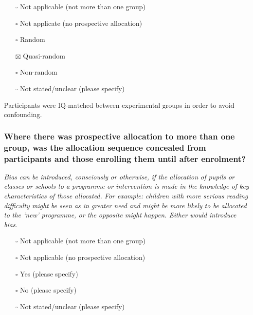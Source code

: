 \documentclass[
  doc, a4paper]{apa7}
\providecommand{\tightlist}{%
  \setlength{\itemsep}{0pt}\setlength{\parskip}{0pt}}
\begin{document}
\begin{itemize}
\tightlist
\item[$\square$]
  Not applicable (not more than one group)\\
\item[$\square$]
  Not applicate (no prospective allocation)\\
\item[$\square$]
  Random\\
\item[$\boxtimes$]
  Quasi-random\\
\item[$\square$]
  Non-random\\
\item[$\square$]
  Not stated/unclear (please specify)
\end{itemize}

Participants were IQ-matched between experimental groups in order to avoid confounding.

\subsubsection{Where there was prospective allocation to more than one group, was the allocation sequence concealed from participants and those enrolling them until after enrolment?}\label{where-there-was-prospective-allocation-to-more-than-one-group-was-the-allocation-sequence-concealed-from-participants-and-those-enrolling-them-until-after-enrolment}

\emph{Bias can be introduced, consciously or otherwise, if the allocation of pupils or classes or schools to a programme or intervention is made in the knowledge of key characteristics of those allocated. For example: children with more serious reading difficulty might be seen as in greater need and might be more likely to be allocated to the `new' programme, or the opposite might happen. Either would introduce bias.}

\begin{itemize}
\tightlist
\item[$\square$]
  Not applicable (not more than one group)\\
\item[$\square$]
  Not applicable (no prospective allocation)\\
\item[$\square$]
  Yes (please specify)\\
\item[$\square$]
  No (please specify)\\
\item[$\square$]
  Not stated/unclear (please specify)
\end{itemize}
\end{document}
